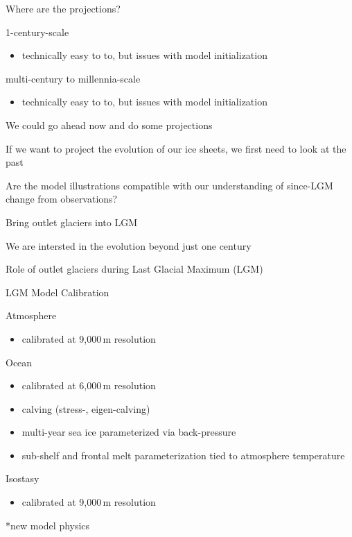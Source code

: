 \documentclass[shownotes notes,intlimits]{beamer}
\begin{document}
\begin{frame}{Where are the projections?}

\begin{block}{1-century-scale}
  \begin{itemize}
  \item technically easy to to, but issues with model initialization
  \end{itemize}
\end{block}

\begin{block}{multi-century to millennia-scale}
  \begin{itemize}
  \item technically easy to to, but issues with model initialization
  \end{itemize}
\end{block}

We could go ahead now and do some projections

If we want to project the evolution of our ice sheets, we first need to look at the past

Are the model illustrations compatible with our understanding of since-LGM change from observations?

Bring outlet glaciers into LGM

We are intersted in the evolution beyond just one century
\end{frame}

\begin{frame}{Role of outlet glaciers during Last Glacial Maximum (LGM)}

\end{frame}

\begin{frame}{LGM Model Calibration}
  \begin{block}{Atmosphere}
    \begin{itemize}
    \item calibrated at 9,000\,m resolution
    \end{itemize}
  \end{block}
  \begin{block}{Ocean}
    \begin{itemize}
    \item calibrated at 6,000\,m resolution
    \item calving (\alert{stress}-, eigen-calving)
    \item \alert{multi-year sea ice parameterized via back-pressure}
    \item \alert{sub-shelf and frontal melt parameterization tied to atmosphere temperature}
    \end{itemize}
  \end{block}
  \begin{block}{Isostasy}
    \begin{itemize}
      \item calibrated at 9,000\,m resolution
      \end{itemize}
    \end{block}
    \alert{*new model physics}
\end{frame}
\end{document}
